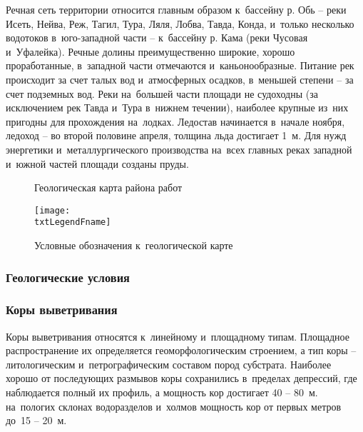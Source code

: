 Речная сеть территории относится главным образом к~бассейну р. Обь  --  реки Исеть, Нейва, Реж, Тагил, Тура, Ляля, Лобва, Тавда, Конда, и~только несколько водотоков в~юго-западной части  --  к~бассейну р. Кама (реки Чусовая и~Уфалейка). Речные долины преимущественно широкие, хорошо проработанные, в~западной части отмечаются и~каньонообразные. Питание рек происходит за счет талых вод и~атмосферных осадков, в~меньшей степени  --  за счет подземных вод. Реки на~большей части площади не судоходны (за исключением рек Тавда и~Тура в~нижнем течении), наиболее крупные из~них пригодны для прохождения на~лодках. Ледостав начинается в~начале ноября, ледоход  --  во второй половине апреля, толщина льда достигает 1~м. Для нужд энергетики и~металлургического производства на~всех
главных реках западной и~южной частей площади созданы пруды.

\begin{figure}[h]
	\centering
	\caption{Геологическая карта района работ}
\end{figure}

\begin{figure}[!h]
	\centering
	\texttt{[image: \\txtLegendFname]}
	\caption[Условные обозначения]{Условные обозначения к~геологической карте}
	\label{img:legend}
\end{figure}

\subsubsection{Геологические условия}
\txtGeology

\subsubsection*{Коры выветривания}
Коры выветривания относятся к~линейному и~площадному типам. Площадное распространение их определяется геоморфологическим строением, а тип коры  --  литологическим и~петрографическим составом пород субстрата. Наиболее хорошо от последующих размывов коры сохранились в~пределах депрессий, где наблюдается полный их профиль, а  мощность кор достигает 40  --  80~м. на~пологих склонах водоразделов и~холмов мощность кор от первых метров до~15 -- 20~м.

